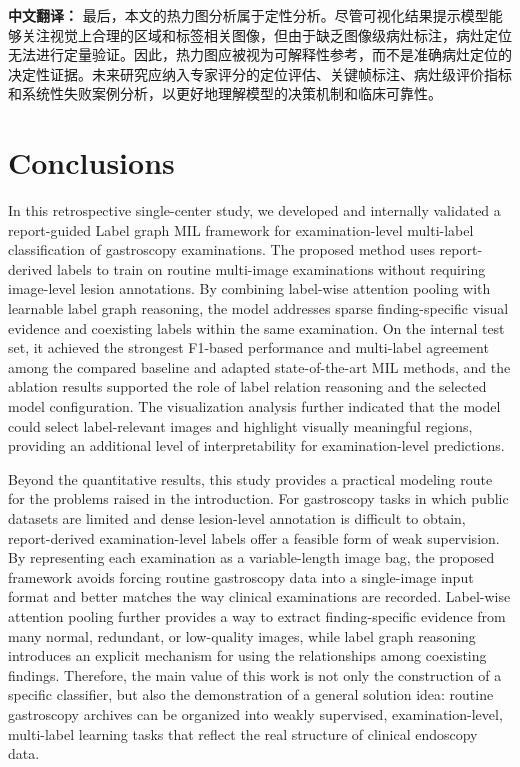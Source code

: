 \documentclass[Afour,sagev,times]{sagej}
\begin{document}
\textbf{中文翻译：} 最后，本文的热力图分析属于定性分析。尽管可视化结果提示模型能够关注视觉上合理的区域和标签相关图像，但由于缺乏图像级病灶标注，病灶定位无法进行定量验证。因此，热力图应被视为可解释性参考，而不是准确病灶定位的决定性证据。未来研究应纳入专家评分的定位评估、关键帧标注、病灶级评价指标和系统性失败案例分析，以更好地理解模型的决策机制和临床可靠性。

\section{Conclusions}
In this retrospective single-center study, we developed and internally validated a report-guided Label graph MIL framework for examination-level multi-label classification of gastroscopy examinations. The proposed method uses report-derived labels to train on routine multi-image examinations without requiring image-level lesion annotations. By combining label-wise attention pooling with learnable label graph reasoning, the model addresses sparse finding-specific visual evidence and coexisting labels within the same examination. On the internal test set, it achieved the strongest F1-based performance and multi-label agreement among the compared baseline and adapted state-of-the-art MIL methods, and the ablation results supported the role of label relation reasoning and the selected model configuration. The visualization analysis further indicated that the model could select label-relevant images and highlight visually meaningful regions, providing an additional level of interpretability for examination-level predictions.

Beyond the quantitative results, this study provides a practical modeling route for the problems raised in the introduction. For gastroscopy tasks in which public datasets are limited and dense lesion-level annotation is difficult to obtain, report-derived examination-level labels offer a feasible form of weak supervision. By representing each examination as a variable-length image bag, the proposed framework avoids forcing routine gastroscopy data into a single-image input format and better matches the way clinical examinations are recorded. Label-wise attention pooling further provides a way to extract finding-specific evidence from many normal, redundant, or low-quality images, while label graph reasoning introduces an explicit mechanism for using the relationships among coexisting findings. Therefore, the main value of this work is not only the construction of a specific classifier, but also the demonstration of a general solution idea: routine gastroscopy archives can be organized into weakly supervised, examination-level, multi-label learning tasks that reflect the real structure of clinical endoscopy data.
\end{document}
